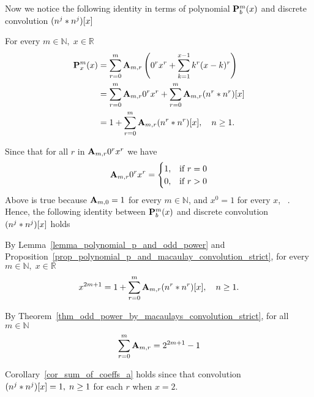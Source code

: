 Now we notice the following identity in terms of polynomial ${\mathbf{P}}\sp{m} \sb{b}(x)$ and
discrete convolution $(n \sp{j} \ast n \sp{j}) [x]$
\begin{prop}
    \label{prop_polynomial_p_and_macaulay_convolution_strict}
    For every $m \in \mathbb{N}, \; x\in\mathbb{R}$
    \begin{equation*}
        \begin{split}
            {\mathbf{P}}\sp{m} \sb{x}(x)
            &=\sum_{r=0}^{m} {\mathbf{A}} \sb{m,r} \left(0^r x^r + \sum_{k=1}^{x-1} k^r (x-k)^r \right) \\
            &=\sum_{r=0}^{m} {\mathbf{A}} \sb{m,r} 0^r x^r + \sum_{r=0}^{m} {\mathbf{A}} \sb{m,r} (n \sp{r} \ast n \sp{r}) [x] \\
            &=1 + \sum_{r=0}^{m} {\mathbf{A}} \sb{m,r} (n \sp{r} \ast n \sp{r}) [x], \quad n\geq 1.
        \end{split}
    \end{equation*}
\end{prop}
Since that for all $r$ in ${\mathbf{A}} \sb{m,r} 0^r x^r$ we have
\begin{equation*}
    {\mathbf{A}} \sb{m,r} 0^r x^r =
    \begin{cases}
        1, & \mbox{if } r=0 \\
        0, & \mbox{if } r>0
    \end{cases}
\end{equation*}
Above is true because ${\mathbf{A}} \sb{m,0}=1$ for every $m\in\mathbb{N}$, and $x^0 = 1$
for every $x$, ~\cite{Grah94SN}.
Hence, the following identity between ${\mathbf{P}}\sp{m} \sb{b}(x)$ and
discrete convolution $(n \sp{j} \ast n \sp{j}) [x]$ holds
\begin{thm}
    \label{thm_odd_power_by_macaulays_convolution_strict}
    By Lemma~\ref{lemma_polynomial_p_and_odd_power} and
    Proposition~\ref{prop_polynomial_p_and_macaulay_convolution_strict},
    for every $m\in\mathbb{N}, \; x\in\mathbb{R}$
    \begin{equation*}
        x^{2m+1} = 1 + \sum_{r=0}^{m} {\mathbf{A}} \sb{m,r} (n \sp{r} \ast n \sp{r}) [x], \quad n\geq 1.
    \end{equation*}
\end{thm}
\begin{cor}
    \label{cor_sum_of_coeffs_a}
    By Theorem~\ref{thm_odd_power_by_macaulays_convolution_strict}, for all $m\in\mathbb{N}$
    \begin{equation*}
        \sum_{r=0}^{m} {\mathbf{A}} \sb{m,r} = 2^{2m+1} - 1
    \end{equation*}
\end{cor}
Corollary~\ref{cor_sum_of_coeffs_a} holds since that convolution $(n \sp{j} \ast n \sp{j}) [x]=1, \; n\geq 1$
for each $r$ when $x=2$.